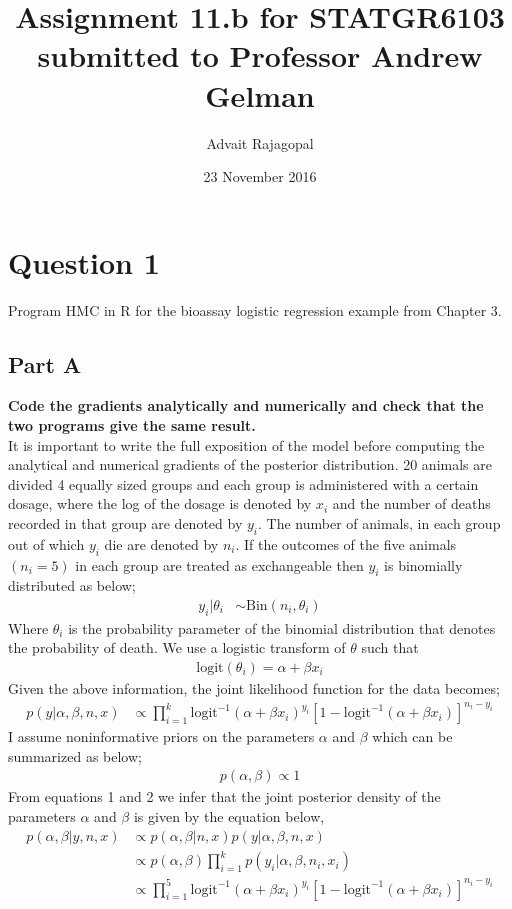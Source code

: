\documentclass{article}
\title{Assignment 11.b for \textbf{STATGR6103}\\
\large submitted to Professor Andrew Gelman}
\date{23 November 2016}
\author{Advait Rajagopal}
\begin{document}
  \maketitle
\section{Question 1}
Program HMC in R for the bioassay logistic regression example from Chapter 3.
\subsection{Part A}
\textbf{Code the gradients analytically and numerically and check that the two programs give the same result.}\\
It is important to write the full exposition of the model before computing the analytical and numerical gradients of the posterior distribution. 20 animals are divided  4 equally sized groups and each group is administered with a certain dosage, where the log of the dosage is denoted by $x_i$ and the number of deaths recorded in that group are denoted by $y_i$. The number of animals, in each group out of which $y_i$ die are denoted by $n_i$. If the outcomes of the five animals $(n_i = 5)$ in each group are treated as exchangeable then  $y_i$ is binomially distributed as below;
\begin{align*}
y_i|\theta_i &\sim \text{Bin}(n_i , \theta_i)
\end{align*}
Where $\theta_i$ is the probability parameter of the binomial distribution that denotes the probability of death. We use a logistic transform of $\theta$ such that
\begin{align*}
\text{logit}(\theta_i) = \alpha + \beta x_i
\end{align*}
Given the above information, the joint likelihood function for the data becomes;
\begin{align}
p(y | \alpha, \beta, n, x) &\propto \prod_{i = 1}^{k}\text{logit}^{-1}(\alpha + \beta x_i) ^{y_i} [1 - \text{logit}^{-1}(\alpha + \beta x_i) ]^{n_i - y_i} 
\end{align}
I assume noninformative priors on the parameters $\alpha$ and $\beta$ which can be summarized as below;
\begin{align}
p(\alpha,\beta) \propto 1
\end{align}
From equations 1 and 2 we infer that the joint posterior density of the parameters $\alpha$ and $\beta$ is given by the equation below,
\begin{align*}
p(\alpha, \beta | y, n, x) &\propto p(\alpha, \beta | n,x) p(y | \alpha, \beta, n, x)\\
&\propto p(\alpha, \beta) \prod_{i = 1}^{k}p(y_i | \alpha, \beta, n_i, x_i)\\
&\propto \prod_{i =1}^{5} \text{logit}^{-1}(\alpha + \beta x_i) ^{y_i} [1 - \text{logit}^{-1}(\alpha + \beta x_i) ]^{n_i - y_i} 
\end{align*}
\end{document}
